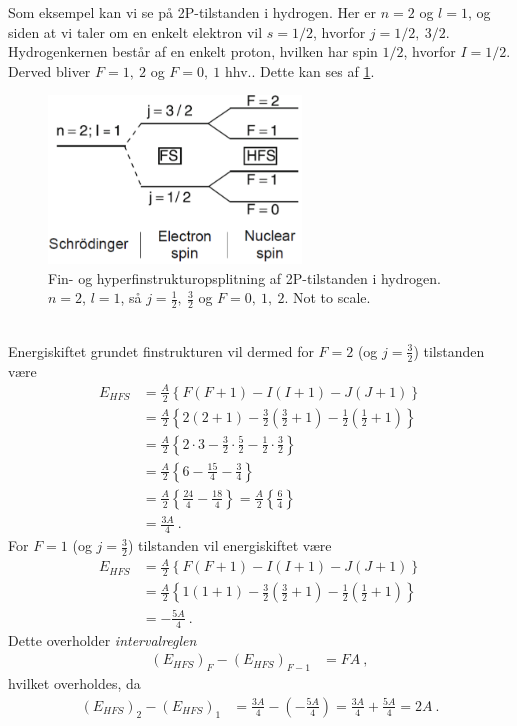 Som eksempel kan vi se på 2P-tilstanden i hydrogen. Her er $n = 2$ og $l = 1$, og siden at vi taler om en enkelt elektron vil $s = 1/2$, hvorfor $j = 1/2,\: 3/2$. Hydrogenkernen består af en enkelt proton, hvilken har spin $1/2$, hvorfor $I = 1/2$. Derved bliver $F = 1,\: 2$ og $F = 0,\: 1$ hhv.. Dette kan ses af \cref{fig:Q16_HyperFineSplittingOf2PstateInHydrogen}.
\begin{figure}[!h]
    \centering
    \includegraphics[width=0.60\textwidth]{Q16/images/HyperFineSplittingOf2PstateInHydrogen.PNG}
    \caption{Fin- og hyperfinstrukturopsplitning af 2P-tilstanden i hydrogen. $n = 2$, $l = 1$, så $j = \frac{1}{2}, \: \frac{3}{2}$ og $F = 0,\: 1,\: 2$. Not to scale.}
    \label{fig:Q16_HyperFineSplittingOf2PstateInHydrogen}
\end{figure}\\
Energiskiftet grundet finstrukturen vil dermed for $F = 2$ (og $j = \frac{3}{2}$) tilstanden være
\begin{align}
    E_{HFS} &= \frac{A}{2} \left\{F(F+1) - I(I+1) - J(J+1)\right\} \nonumber\\
    &= \frac{A}{2} \left\{2(2+1) - \frac{3}{2}(\frac{3}{2}+1) - \frac{1}{2}(\frac{1}{2}+1)\right\} \nonumber\\
    &= \frac{A}{2} \left\{2 \cdot 3 - \frac{3}{2} \cdot \frac{5}{2} - \frac{1}{2} \cdot \frac{3}{2}\right\} \nonumber\\
    &= \frac{A}{2} \left\{6 - \frac{15}{4} - \frac{3}{4}\right\} \nonumber\\
    &= \frac{A}{2} \left\{\frac{24}{4} - \frac{18}{4}\right\}
    = \frac{A}{2} \left\{\frac{6}{4}\right\} \nonumber\\
    &= \frac{3A}{4} \: .
\end{align}
For $F = 1$ (og $j = \frac{3}{2}$) tilstanden vil energiskiftet være
\begin{align}
    E_{HFS} &= \frac{A}{2} \left\{F(F+1) - I(I+1) - J(J+1)\right\} \nonumber\\
    &= \frac{A}{2} \left\{1(1+1) - \frac{3}{2}(\frac{3}{2}+1) - \frac{1}{2}(\frac{1}{2}+1)\right\} \nonumber\\
    &= -\frac{5A}{4} \: .
\end{align}
Dette overholder \emph{intervalreglen}
\begin{align}
    (E_{HFS})_F - (E_{HFS})_{F-1} &= FA \: ,
\end{align}
hvilket overholdes, da
\begin{align}
    (E_{HFS})_2 - (E_{HFS})_1 &= \frac{3A}{4} - \left(-\frac{5A}{4}\right) = \frac{3A}{4} + \frac{5A}{4} = 2A \: .
\end{align}